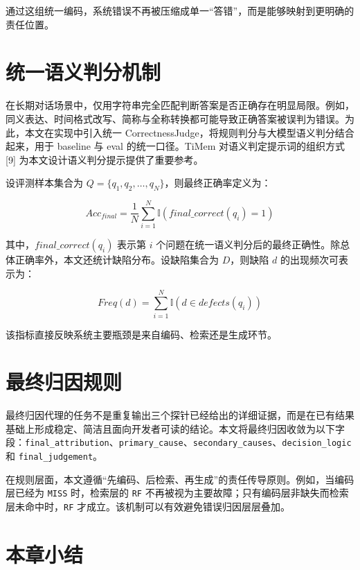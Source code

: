 通过这组统一编码，系统错误不再被压缩成单一“答错”，而是能够映射到更明确的责任位置。

\section{统一语义判分机制}

在长期对话场景中，仅用字符串完全匹配判断答案是否正确存在明显局限。例如，同义表达、时间格式改写、简称与全称转换都可能导致正确答案被误判为错误。为此，本文在实现中引入统一 CorrectnessJudge，将规则判分与大模型语义判分结合起来，用于 baseline 与 eval 的统一口径。TiMem 对语义判定提示词的组织方式 [9] 为本文设计语义判分提示提供了重要参考。

设评测样本集合为 $Q=\{q_1,q_2,\ldots,q_N\}$，则最终正确率定义为：

\begin{equation}
Acc_{final}=\frac{1}{N}\sum_{i=1}^{N}\mathbb{I}(final\_correct(q_i)=1)
\end{equation}

其中，$final\_correct(q_i)$ 表示第 $i$ 个问题在统一语义判分后的最终正确性。除总体正确率外，本文还统计缺陷分布。设缺陷集合为 $D$，则缺陷 $d$ 的出现频次可表示为：

\begin{equation}
Freq(d)=\sum_{i=1}^{N}\mathbb{I}(d \in defects(q_i))
\end{equation}

该指标直接反映系统主要瓶颈是来自编码、检索还是生成环节。

\section{最终归因规则}

最终归因代理的任务不是重复输出三个探针已经给出的详细证据，而是在已有结果基础上形成稳定、简洁且面向开发者可读的结论。本文将最终归因收敛为以下字段：\texttt{final\_attribution}、\texttt{primary\_cause}、\texttt{secondary\_causes}、\texttt{decision\_logic} 和 \texttt{final\_judgement}。

在规则层面，本文遵循“先编码、后检索、再生成”的责任传导原则。例如，当编码层已经为 \texttt{MISS} 时，检索层的 \texttt{RF} 不再被视为主要故障；只有编码层非缺失而检索层未命中时，\texttt{RF} 才成立。该机制可以有效避免错误归因层层叠加。

\section{本章小结}

